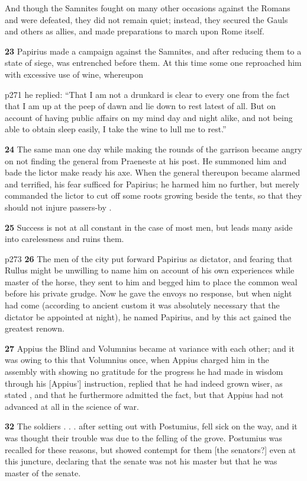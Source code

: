 And though the Samnites fought on many other occasions against the Romans and were defeated, they did not remain quiet; instead, they secured the Gauls and others as allies, and made preparations to march upon Rome itself.

\textbf{23} Papirius made a campaign against the Samnites, and after redu­cing them to a state of siege, was entrenched before them. At this time some one reproached him with excessive use of wine, whereupon

p271 he replied: ``That I am not a drunkard is clear to every one from the fact that I am up at the peep of dawn and lie down to rest latest of all. But on account of having public affairs on my mind day and night alike, and not being able to obtain sleep easily, I take the wine to lull me to rest.''

\textbf{24} The same man one day while making the rounds of the garrison became angry on not finding the general from Praeneste at his post. He summoned him and bade the lictor make ready his axe. When the general thereupon became alarmed and terrified, his fear sufficed for Papirius; he harmed him no further, but merely commanded the lictor to cut off some roots growing beside the tents, so that they should not injure passers-by .

\textbf{25} Success is not at all constant in the case of most men, but leads many aside into carelessness and ruins them.

p273
\textbf{26} The men of the city put forward Papirius as dictator, and fearing that Rullus might be unwilling to name him on account of his own experiences while master of the horse, they sent to him and begged him to place the common weal before his private grudge. Now he gave the envoys no response, but when night had come (according to ancient custom it was absolutely necessary that the dictator be appointed at night), he named Papirius, and by this act gained the greatest renown.

\textbf{27} Appius the Blind and Volumnius became at variance with each other; and it was owing to this that Volumnius once, when Appius charged him in the assembly with showing no gratitude for the progress he had made in wisdom through his [Appius'] instruction, replied that he had indeed grown wiser, as stated , and that he furthermore admitted the fact, but that Appius had not advanced at all in the science of war.

\textbf{32} The soldiers . . . after setting out with Postumius, fell sick on the way, and it was thought their trouble was due to the felling of the grove. Postumius was recalled for these reasons, but showed contempt for them [the senators?] even at this juncture, declaring that the senate was not his master but that he was master of the senate.

